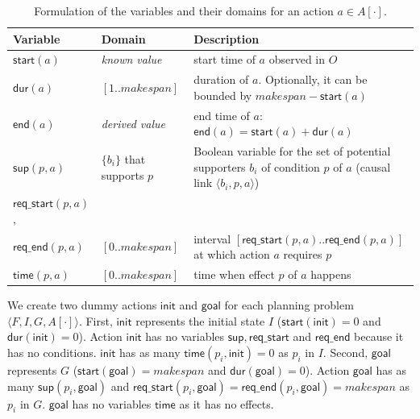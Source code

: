 \documentclass[runningheads]{llncs}
\newcommand{\tup}[1]{{\langle #1 \rangle}}
\newcommand{\dur}{\mathsf{dur}}    %
\newcommand{\start}{\mathsf{start}}%
\newcommand{\en}{\mathsf{end}}     %
\newcommand{\supp}{\mathsf{sup}}   %
\newcommand{\tim}{\mathsf{time}}   %
\newcommand{\reqs}{\mathsf{req\_{start}}} %
\newcommand{\reqe}{\mathsf{req\_{end}}}   %
\newcommand{\ini}{\mathsf{init}}   %
\newcommand{\goal}{\mathsf{goal}}  %
\begin{document}
\begin{table}
\begin{center}
\small
\begin{tabular}{p{2cm}p{2.7cm}p{7.4cm}}
Variable & Domain & Description \\

\hline


$\start(a)$ & \emph{known value} & start time of $a$ observed in $O$ \\
$\dur(a)$ & $[1..makespan]$ & duration of $a$. Optionally, it can be bounded by $makespan-\start(a)$\\
$\en(a)$ & \emph{derived value} & end time of $a$: $\en(a)=\start(a)+\dur(a)$ \\


$\supp(p,a)$ & $\{b_i\}$ that \newline supports $p$ & Boolean variable for the set of potential supporters $b_i$ of condition $p$ of $a$ (causal link $\tup{b_i,p,a}$) \\

$\reqs(p,a)$, \\
$\reqe(p,a)$ & $[0..makespan]$ & interval $[\reqs(p,a)..\reqe(p,a)]$ at which action $a$ requires $p$ \\

$\tim(p,a)$ & $[0..makespan]$ & time when effect $p$ of $a$ happens \\


\hline
\end{tabular}
\normalsize
\end{center}
\caption{Formulation of the variables and their domains for an action $a\in A[\cdot]$.}
\label{table:variables}
\end{table}


We create two dummy actions $\ini$ and $\goal$ for each planning problem $\tup{F,I,G,A[\cdot]}$. First, $\ini$ represents the initial state $I$ ($\start(\ini)=0$ and $\dur(\ini)=0$). Action $\ini$ has no variables $\supp, \reqs$ and $\reqe$ because it has no conditions. $\ini$ has as many $\tim(p_i,\ini)=0$ as $p_i$ in $I$. Second, $\goal$ represents $G$ ($\start(\goal)=makespan$ and $\dur(\goal)=0$). Action $\goal$ has as many $\supp(p_i,\goal)$ and $\reqs(p_i,\goal)=\reqe(p_i,\goal)=makespan$ as $p_i$ in $G$. $\goal$ has no variables $\tim$ as it has no effects.
\end{document}
